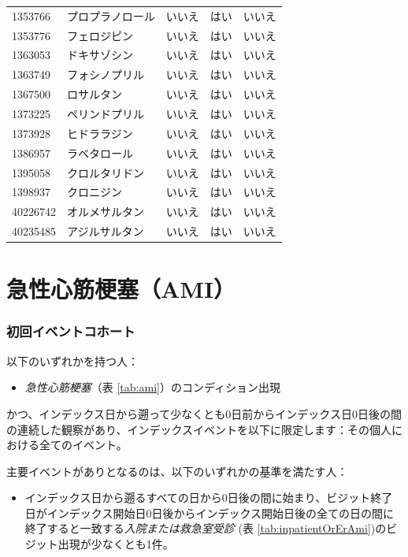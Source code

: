 \documentclass[
  11pt]{book}
\providecommand{\tightlist}{%
  \setlength{\itemsep}{0pt}\setlength{\parskip}{0pt}}
\theoremstyle{definition}
\theoremstyle{definition}
\theoremstyle{definition}
\theoremstyle{definition}
\theoremstyle{remark}
\begin{document}
\begin{longtable}[]{@{}lllll@{}}
1353766 & プロプラノロール & いいえ & はい & いいえ \\
1353776 & フェロジピン & いいえ & はい & いいえ \\
1363053 & ドキサゾシン & いいえ & はい & いいえ \\
1363749 & フォシノプリル & いいえ & はい & いいえ \\
1367500 & ロサルタン & いいえ & はい & いいえ \\
1373225 & ペリンドプリル & いいえ & はい & いいえ \\
1373928 & ヒドララジン & いいえ & はい & いいえ \\
1386957 & ラベタロール & いいえ & はい & いいえ \\
1395058 & クロルタリドン & いいえ & はい & いいえ \\
1398937 & クロニジン & いいえ & はい & いいえ \\
40226742 & オルメサルタン & いいえ & はい & いいえ \\
40235485 & アジルサルタン & いいえ & はい & いいえ \\
\end{longtable}

\section{急性心筋梗塞（AMI）}\label{Ami}

\subsubsection*{初回イベントコホート}\label{ux521dux56deux30a4ux30d9ux30f3ux30c8ux30b3ux30dbux30fcux30c8-2}

以下のいずれかを持つ人：

\begin{itemize}
\tightlist
\item
  \emph{急性心筋梗塞}（表 \ref{tab:ami}）のコンディション出現
\end{itemize}

かつ、インデックス日から遡って少なくとも0日前からインデックス日0日後の間の連続した観察があり、インデックスイベントを以下に限定します：その個人における全てのイベント。

主要イベントがありとなるのは、以下のいずれかの基準を満たす人：

\begin{itemize}
\tightlist
\item
  インデックス日から遡るすべての日から0日後の間に始まり、ビジット終了日がインデックス開始日0日後からインデックス開始日後の全ての日の間に終了すると一致する\emph{入院または救急室受診} (表 \ref{tab:inpatientOrErAmi})のビジット出現が少なくとも1件。
\end{itemize}
\end{document}
